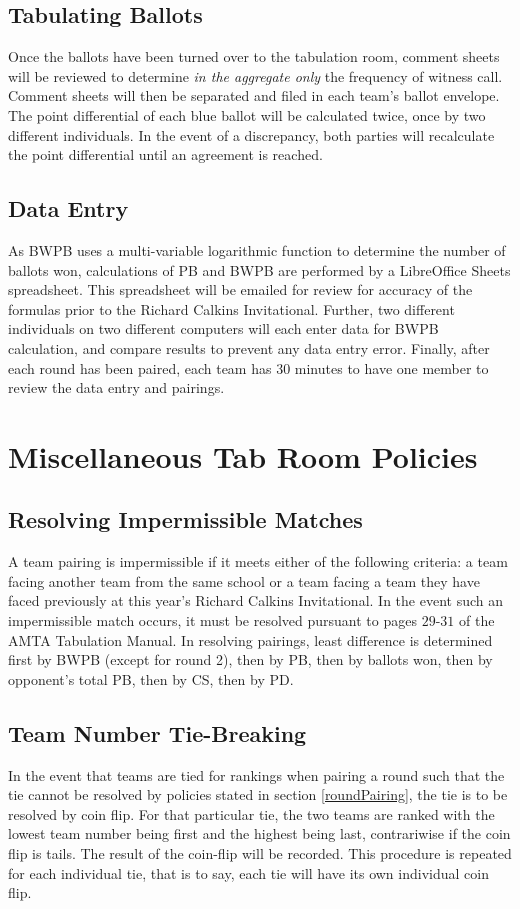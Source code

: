 \documentclass{article}
\begin{document}
\subsection{Tabulating Ballots}
Once the ballots have been turned over to the tabulation room, comment sheets will be reviewed to determine \textit{in the aggregate only} the frequency of witness call.  Comment sheets will then be separated and filed in each team's ballot envelope.  The point differential of each blue ballot will be calculated twice, once by two different individuals.  In the event of a discrepancy, both parties will recalculate the point differential until an agreement is reached.
\subsection{Data Entry}
As BWPB uses a multi-variable logarithmic function to determine the number of ballots won, calculations of PB and BWPB are performed by a LibreOffice Sheets spreadsheet.  This spreadsheet will be emailed for review for accuracy of the formulas prior to the Richard Calkins Invitational.  Further, two different individuals on two different computers will each enter data for BWPB calculation, and compare results to prevent any data entry error.  Finally, after each round has been paired, each team has 30 minutes to have one member to review the data entry and pairings.
\section{Miscellaneous Tab Room Policies}
\subsection{Resolving Impermissible Matches}
\label{impermissible}
A team pairing is impermissible if it meets either of the following criteria:  a team facing another team from the same school or a team facing a team they have faced previously at this year's Richard Calkins Invitational.  In the event such an impermissible match occurs, it must be resolved pursuant to pages $29$-$31$ of the AMTA Tabulation Manual.  In resolving pairings, least difference is determined first by BWPB (except for round 2), then by PB, then by ballots won, then by opponent's total PB, then by CS, then by PD.
\subsection{Team Number Tie-Breaking}
\label{tiebreaking}
In the event that teams are tied for rankings when pairing a round such that the tie cannot be resolved by policies stated in section \ref{roundPairing}, the tie is to be resolved by coin flip.  For that particular tie, the two teams are ranked with the lowest team number being first and the highest being last, contrariwise if the coin flip is tails. The result of the coin-flip will be recorded. This procedure is repeated for each individual tie, that is to say, each tie will have its own individual coin flip.
\end{document}
